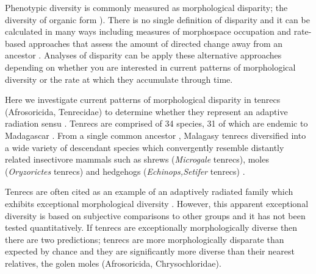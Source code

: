 \documentclass[12pt,a4paper]{article}
\begin{document}
Phenotypic diversity is commonly measured as morphological disparity; the diversity of organic form \citep{Foote1997,Erwin2007}). There is no single definition of disparity and it can be calculated in many ways including measures of morphospace occupation \citep[e.g.][]{Goswami2011, Brusatte2008} and rate-based approaches that assess the amount of directed change away from an ancestor \citep{OMeara2006, Price2013}. Analyses of disparity can be apply these alternative approaches depending on whether you are interested in current patterns of morphological diversity or the rate at which they accumulate through time. 




Here we investigate current patterns of morphological disparity in tenrecs (Afrosoricida, Tenrecidae) to determine whether they represent an adaptive radiation sensu \citep{Losos2010a}. Tenrecs are comprised of 34 species, 31 of which are endemic to Madagascar \citep{Olson2013}. From a single common ancestor \citep{Asher2006}, Malagasy tenrecs diversified into a wide variety of descendant species which convergently resemble distantly related insectivore mammals such as shrews (\textit{Microgale} tenrecs), moles (\textit{Oryzorictes} tenrecs) and hedgehogs (\textit{Echinops,Setifer} tenrecs) \citep{Eisenberg1969}.

Tenrecs are often cited as an example of an adaptively radiated family which exhibits exceptional morphological diversity \citep{Soarimalala2011, Olson2003, Eisenberg1969}. However, this apparent exceptional diversity is based on subjective comparisons to other groups and it has not been tested quantitatively. If tenrecs are exceptionally morphologically diverse then there are two predictions; tenrecs are more morphologically disparate than expected by chance and they are significantly more diverse than their nearest relatives, the golen moles (Afrosoricida, Chrysochloridae).


\end{document}
